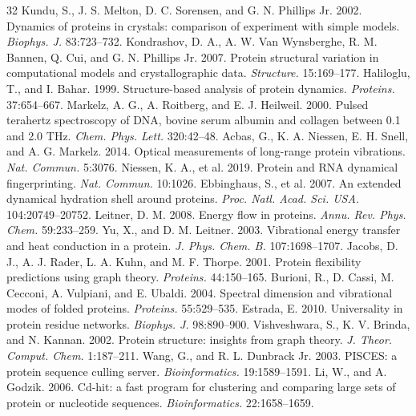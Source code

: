 \documentclass[11pt,onecolumn,letterpaper]{article}
\begin{document}
\begin{thebibliography}{32}
 Kundu, S., J. S. Melton, D. C. Sorensen, and G. N. Phillips Jr. 2002. Dynamics of proteins in crystals: comparison of experiment with simple models. \textit{Biophys. J.} 83:723--732.
 Kondrashov, D. A., A. W. Van Wynsberghe, R. M. Bannen, Q. Cui, and G. N. Phillips Jr. 2007. Protein structural variation in computational models and crystallographic data. \textit{Structure.} 15:169--177.
 Haliloglu, T., and I. Bahar. 1999. Structure-based analysis of protein dynamics. \textit{Proteins.} 37:654--667.
 Markelz, A. G., A. Roitberg, and E. J. Heilweil. 2000. Pulsed terahertz spectroscopy of DNA, bovine serum albumin and collagen between 0.1 and 2.0 THz. \textit{Chem. Phys. Lett.} 320:42--48.
 Acbas, G., K. A. Niessen, E. H. Snell, and A. G. Markelz. 2014. Optical measurements of long-range protein vibrations. \textit{Nat. Commun.} 5:3076.
 Niessen, K. A., et al. 2019. Protein and RNA dynamical fingerprinting. \textit{Nat. Commun.} 10:1026.
 Ebbinghaus, S., et al. 2007. An extended dynamical hydration shell around proteins. \textit{Proc. Natl. Acad. Sci. USA.} 104:20749--20752.
 Leitner, D. M. 2008. Energy flow in proteins. \textit{Annu. Rev. Phys. Chem.} 59:233--259.
 Yu, X., and D. M. Leitner. 2003. Vibrational energy transfer and heat conduction in a protein. \textit{J. Phys. Chem. B.} 107:1698--1707.
 Jacobs, D. J., A. J. Rader, L. A. Kuhn, and M. F. Thorpe. 2001. Protein flexibility predictions using graph theory. \textit{Proteins.} 44:150--165.
 Burioni, R., D. Cassi, M. Cecconi, A. Vulpiani, and E. Ubaldi. 2004. Spectral dimension and vibrational modes of folded proteins. \textit{Proteins.} 55:529--535.
 Estrada, E. 2010. Universality in protein residue networks. \textit{Biophys. J.} 98:890--900.
 Vishveshwara, S., K. V. Brinda, and N. Kannan. 2002. Protein structure: insights from graph theory. \textit{J. Theor. Comput. Chem.} 1:187--211.
 Wang, G., and R. L. Dunbrack Jr. 2003. PISCES: a protein sequence culling server. \textit{Bioinformatics.} 19:1589--1591.
 Li, W., and A. Godzik. 2006. Cd-hit: a fast program for clustering and comparing large sets of protein or nucleotide sequences. \textit{Bioinformatics.} 22:1658--1659.
\end{thebibliography}
\end{document}
